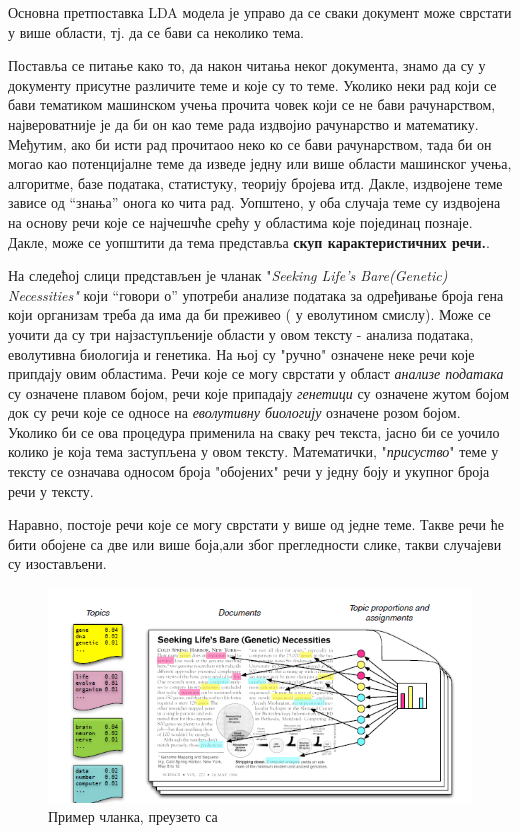 Основна претпоставка  LDA модела је управо да се сваки документ може сврстати у више области, тј. да се бави са неколико тема. 

Поставља се питање како то, да након читања неког документа, знамо да су у документу присутне различите теме и које су то теме. Уколико неки рад који се бави тематиком машинском учења прочита човек који се не бави рачунарством, највероватније је да би он као теме рада издвојио рачунарство и математику. Међутим, ако би исти рад прочитаоо неко ко се бави рачунарством, тада би он могао као потенцијалне теме да изведе једну или више области машинског учења, алгоритме, базе података, статистуку, теорију бројева итд. 
Дакле, издвојене теме зависе од "`знања"' онога ко чита рад. Уопштено, у оба случаја теме су издвојена на основу речи које се најчешчће срећу у областима које појединац познаје. Дакле, може се уопштити да тема представља \textbf{скуп карактеристичних речи.}. 

На следећој слици представљен је чланак "\textit{Seeking Life's Bare(Genetic) Necessities"} који "`говори о"' употреби анализе података за одређивање броја гена који организам треба да има да би преживео ( у еволутином смислу). Може се уочити да су три најзаступљеније области у овом тексту - анализа података, еволутивна биологија  и генетика. На њој су "ручно" означене неке речи које припдају овим областима. Речи које се могу сврстати у област \textit{анализе података} су означене плавом бојом, речи које припадају \textit{генетици} су означене жутом бојом док су речи које се односе на \textit{еволутивну биологију} означене розом бојом.
Уколико би се ова процедура применила на сваку реч текста, јасно би се уочило колико је која тема  заступљена у овом тексту. Математички, "\textit{присуство}" теме у тексту се означава односом  броја "обојених" речи у једну боју и укупног броја речи у тексту.

Наравно, постоје речи које се могу сврстати у више од једне теме. Такве речи ће бити обојене са две или више боја,али због прегледности слике, такви случајеви су изостављени.

\begin{figure}
    \centering
   \includegraphics[scale=0.9]{./Slike/slika1.png} 
	\caption{Пример чланка, преузето са \cite{blei1}}
	\label{fig:slika1}
\end{figure}

